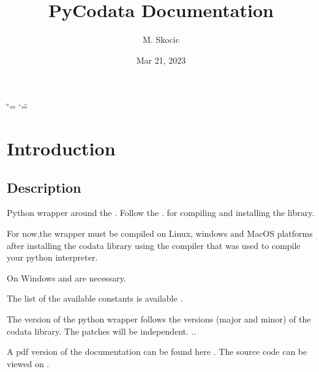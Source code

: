 \documentclass[a4paper,10pt,english]{sphinxmanual}
\title{PyCodata Documentation}
\date{Mar 21, 2023}
\author{M. Skocic}
\begin{document}
\ifdefined\shorthandoff
  \ifnum\catcode`\=\string=\active\shorthandoff{=}\fi
  \ifnum\catcode`\"=\active{}\fi
\fi

\pagestyle{empty}
\sphinxmaketitle
\pagestyle{plain}
\sphinxtableofcontents
\pagestyle{normal}
\label{\detokenize{index::doc}}


\sphinxstepscope


\chapter{Introduction}
\label{\detokenize{getting_started/index:introduction}}\label{\detokenize{getting_started/index::doc}}
\sphinxstepscope


\section{Description}
\label{\detokenize{getting_started/introduction:description}}\label{\detokenize{getting_started/introduction::doc}}
\sphinxAtStartPar
Python wrapper around the
.
Follow the .
for compiling and installing the library.

\sphinxAtStartPar
For now,the wrapper must be compiled on Linux, windows and MacOS platforms
after installing the codata library using the compiler that was used to compile your python interpreter.

\sphinxAtStartPar
On Windows
and
are necessary.

\sphinxAtStartPar
The list of the available constants is available
.

\sphinxAtStartPar
The version of the python wrapper follows the versions (major and minor) of the codata library.
The patches will be independent.
..

\sphinxAtStartPar
A pdf version of the documentation can be found here
.
The source code can be viewed on
.
\end{document}
